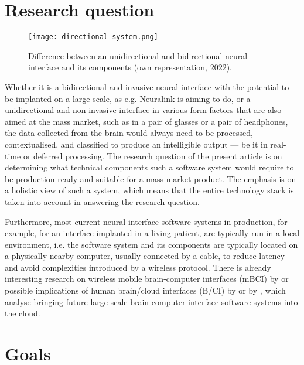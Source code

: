 \section{Research question}
\label{chapter1-research-question}

\begin{figure}[ht]
  \centering
  \texttt{[image: directional-system.png]}
  \caption{Difference between an unidirectional and bidirectional neural interface and its components (own representation, 2022).}
  \label{fig:directional-system}
\end{figure}

Whether it is a bidirectional and invasive neural interface with the potential to be implanted on a large scale, as e.g. Neuralink is aiming to do, or a unidirectional and non-invasive interface in various form factors that are also aimed at the mass market, such as in a pair of glasses or a pair of headphones, the data collected from the brain would always need to be processed, contextualised, and classified to produce an intelligible output — be it in real-time or deferred processing. The research question of the present article is on determining what technical components such a software system would require to be production-ready and suitable for a mass-market product. The emphasis is on a holistic view of such a system, which means that the entire technology stack is taken into account in answering the research question.

Furthermore, most current neural interface software systems in production, for example, for an interface implanted in a living patient, are typically run in a local environment, i.e. the software system and its components are typically located on a physically nearby computer, usually connected by a cable, to reduce latency and avoid complexities introduced by a wireless protocol. There is already interesting research on wireless mobile brain-computer interfaces (mBCI) by \citeauthor{minguillon_mobile_2017} \citeyearpar{minguillon_mobile_2017} or possible implications of human brain/cloud interfaces (B/CI) by \citeauthor{martins_human_2019} \citeyearpar{martins_human_2019} or by \citeauthor{angelica_cognitive_2021} \citeyearpar{angelica_cognitive_2021}, which analyse bringing future large-scale brain-computer interface software systems into the cloud.


\section{Goals}
\label{chapter1-goals}

